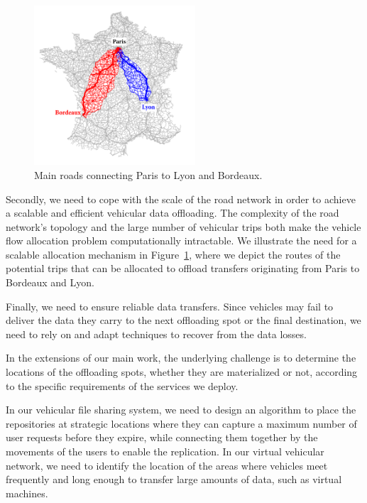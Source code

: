\begin{figure}
    \vspace{-15pt}
    \centering
    \includegraphics[width=6cm]{figures/france-roads-2.pdf}
    \caption{Main roads connecting Paris to Lyon and Bordeaux.}
    \label{fig:paris-lyon}
\end{figure}
Secondly, we need to cope with the scale of the road network in order to achieve a scalable and efficient vehicular data offloading. The complexity of the road network's topology and the large number of vehicular trips both make the vehicle flow allocation problem computationally intractable. We illustrate the need for a scalable allocation mechanism in Figure~\ref{fig:paris-lyon}, where we depict the routes of the potential trips that can be allocated to offload transfers originating from Paris to Bordeaux and Lyon. 

Finally, we need to ensure reliable data transfers. Since vehicles may fail to deliver the data they carry to the next offloading spot or the final destination, we need to rely on and adapt techniques to recover from the data losses.

In the extensions of our main work, the underlying challenge is to determine the locations of the offloading spots, whether they are materialized or not, according to the specific requirements of the services we deploy. 

In our vehicular file sharing system, we need to design an algorithm to place the repositories at strategic locations where they can capture a maximum number of user requests before they expire, while connecting them together by the movements of the users to enable the replication. In our virtual vehicular network, we need to identify the location of the areas where vehicles meet frequently and long enough to transfer large amounts of data, such as virtual machines.



